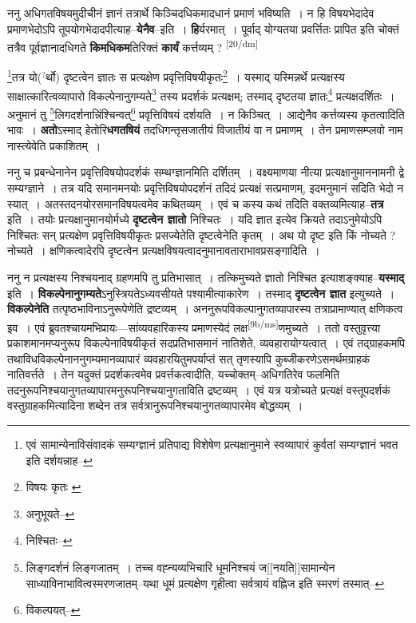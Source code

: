 \documentclass[article,12pt,a4paper]{memoir}
\newcommand{\unclear}[1]{($^{?}$#1)}
\begin{document}
	  \pstart ननु अधिगतविषयमुदीचीनं ज्ञानं तत्रार्थे किञ्चिदधिकमादधानं प्रमाणं भविष्यति । न हि विषयभेदादेव प्रमाणभेदोऽपि तूपयोगभेदादपीत्याह--\textbf{येनैव}--इति । \textbf{हि}र्यरमात् । पूर्वाद् योग्यतया प्रवर्त्तितः प्रापित इति चोक्तं तत्रैव पूर्वज्ञानादधिगते \textbf{किमधिकम}तिरिक्तं \textbf{कार्यं} कर्त्तव्यम् ?  \leavevmode\textsuperscript{\rmlatinfont\tiny [20/dm]} 
	  
	\footnote{एवं सामान्येनाविसंवादकं सम्यग्ज्ञानं प्रतिपाद्य विशेषेण प्रत्यक्षानुमाने स्वव्यापारं कुर्वतां सम्यग्ज्ञानं भवत इति दर्शयन्नाह--\cite{dp-msD-n}}तत्र यो\unclear{र्थो} दृष्टत्वेन ज्ञातः स प्रत्यक्षेण प्रवृत्तिविषयीकृतः\footnote{विषयः कृतः \cite{dp-msB} \cite{dp-msC} \cite{dp-msD}} । यस्माद् यस्मिन्नर्थे प्रत्यक्षस्य साक्षात्कारित्वव्यापारो विकल्पेनानुगम्यते\footnote{अनुभूयते--\cite{dp-msD-n}} तस्य प्रदर्शकं प्रत्यक्षम्; तस्माद् दृष्टतया ज्ञातः\footnote{निश्चितः--\cite{dp-msD-n}} प्रत्यक्षदर्शितः । अनुमानं तु \footnote{लिङ्गदर्शनं लिङ्गजातम् । तच्च वह्न्यव्यभिचारि धूमनिश्चयं ज[[नयति]]सामान्येन साध्याविनाभावित्वस्मरणजातम्--यथा धूमं प्रत्यक्षेण गृहीत्वा सर्वत्रायं वह्निज इति स्मरणं तस्मात्--\cite{dp-msD-n}}लिगदर्शनान्निंश्चिन्वत्\footnote{विकल्पयत्--\cite{dp-msD-n}} प्रवृत्तिविषयं दर्शयति । न किञ्चित् । आद्येनैव कर्त्तव्यस्य कृतत्वादिति भावः । \textbf{अतो}ऽस्माद् हेतोरि\textbf{धगतषियं} तदधिगन्तृसजातीयं विजातीयं वा न प्रमाणम् । तेन प्रमाणसम्प्लवो नाम नास्त्येवेति प्रकाशितम् ।
	\pend
      

	  \pstart ननु च प्रबन्धेनानेन प्रवृत्तिविषयोपदर्शकं सम्थग्ज्ञानमिति दर्शितम् । वक्ष्यमाणया नीत्या प्रत्यक्षानुमाननामनी द्वे सम्यग्ज्ञाने । तत्र यदि समानमनयोः प्रवृत्तिविषयोपदर्शनं तदिदं प्रत्यक्षं सत्प्रमाणम्, इदमनुमानं सदिति भेदो न स्यात् । अतस्तदनयोरसमानविषयत्वमेव कथितव्यम् । एवं च कस्य कथं तदिति वक्तव्यमित्याह--\textbf{तत्र} इति । तयोः प्रत्यक्षानुमानयोर्मध्ये \textbf{दृष्टत्वेन ज्ञातो} निश्चितः । यदि ज्ञात इत्येव क्रियते तदाऽनुमेयोऽपि निश्चितः सन् प्रत्यक्षेण प्रवृत्तिविषयीकृतः प्रसज्येतेति दृष्टत्वेनेति कृतम् । अथ यो दृष्ट इति किं नोच्यते ? नोच्यते । क्षणिकत्वादेरपि दृष्टत्वेन प्रत्यक्षविषयत्वादनुमानावताराभावप्रसङ्गादिति ।
	\pend
      

	  \pstart ननु न प्रत्यक्षस्य निश्चयनाद् ग्रहणमपि तु प्रतिभासात् । तत्किमुच्यते ज्ञातो निश्चित इत्याशङ्क्याह--\textbf{यस्माद्} इति । \textbf{विकल्पेनानुगम्यते}ऽनुस्त्रियतेऽध्यवसीयते पश्यामीत्याकारेण । तस्माद् \textbf{दृष्टत्वेन ज्ञात} इत्युच्यते । \textbf{विकल्पेनेति} तत्पृष्ठभाविनाऽनुरूपेणेति द्रष्टव्यम् । अननुरूपविकल्पानुगतव्यापारस्य तत्राप्रामाण्यात् क्षणिकत्व इव । एवं ब्रुवतश्चायमभिप्रायः—सांव्यवहारिकस्य प्रमाणस्येदं लक्ष\leavevmode\textsuperscript{\rmlatinfont\tiny [9b/ms]}णमुच्यते । ततो वस्तुवृत्त्या प्रकाशमानमप्यनुरूप विकल्पेनाविषयीकृतं सदप्रतिभासमानं नातिशेते, व्यवहारायोग्यत्वात् । एवं तद्ग्राहकमपि तथाविधविकल्पेनाननुगम्यमानव्यापारं व्यवहारयितुमपर्याप्तं सत् तृणस्यापि कुब्जीकरणेऽसमर्थमग्राहकं नातिवर्त्तते । तेन यदुक्तं प्रदर्शकत्वमेव प्रवर्त्तकत्वादीति, यच्चोक्तम्--अधिगतिरेव फलमिति तदनुरूपनिश्चयानुगतव्यापारमनुरूपनिश्चयानुगताविति द्रष्टव्यम् । एवं यत्र यत्रोच्यते प्रत्यक्षं वस्तूपदर्शकं वस्तुग्राहकमित्यादिना शब्देन तत्र सर्वत्रानुरूपनिश्चयानुगतव्यापारमेव बोद्धव्यम् ।
	\pend
      
\end{document}
